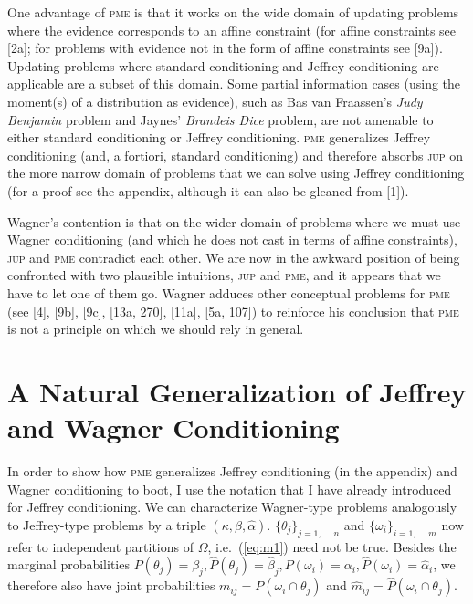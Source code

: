 \documentclass[entropy,article,submit,oneauthor,pdftex,12pt,a4paper]{mdpi}
\begin{document}
One advantage of \textsc{pme} is that it works on the wide domain of
updating problems where the evidence corresponds to an affine
constraint (for affine constraints see [2a]; for problems with
evidence not in the form of affine constraints see [9a]). Updating
problems where standard conditioning and Jeffrey conditioning are
applicable are a subset of this domain. Some partial information cases
(using the moment(s) of a distribution as evidence), such as Bas van
Fraassen's \emph{Judy Benjamin} problem and Jaynes' \emph{Brandeis
  Dice} problem, are not amenable to either standard conditioning or
Jeffrey conditioning. \textsc{pme} generalizes Jeffrey conditioning
(and, a fortiori, standard conditioning) and therefore absorbs
\textsc{jup} on the more narrow domain of problems that we can solve
using Jeffrey conditioning (for a proof see the appendix, although it
can also be gleaned from [1]). 

Wagner's contention is that on the wider domain of problems where we
must use Wagner conditioning (and which he does not cast in terms of
affine constraints), \textsc{jup} and \textsc{pme} contradict each
other. We are now in the awkward position of being confronted with two
plausible intuitions, \textsc{jup} and \textsc{pme}, and it appears
that we have to let one of them go. Wagner adduces other conceptual
problems for \textsc{pme} (see [4], [9b], [9c], [13a, 270], [11a],
[5a, 107]) to reinforce his conclusion that \textsc{pme} is not a
principle on which we should rely in general.

\section{A Natural Generalization of Jeffrey and Wagner Conditioning}
\label{Generalization}

In order to show how \textsc{pme} generalizes Jeffrey conditioning (in
the appendix) and Wagner conditioning to boot, I use the notation that
I have already introduced for Jeffrey conditioning. We can
characterize Wagner-type problems analogously to Jeffrey-type problems
by a triple $(\kappa,\beta,\hat{\alpha})$.
$\{\theta_{j}\}_{j=1,\ldots,n}$ and $\{\omega_{i}\}_{i=1,\ldots,m}$
now refer to independent partitions of $\Omega$, i.e.\ (\ref{eq:m1})
need not be true. Besides the marginal probabilities
$P(\theta_{j})=\beta_{j}, \hat{P}(\theta_{j})=\hat{\beta}_{j},
P(\omega_{i})=\alpha_{i},\hat{P}(\omega_{i})=\hat{\alpha}_{i}$, we
therefore also have joint probabilities
$m_{ij}=P(\omega_{i}\cap\theta_{j})$ and
$\hat{m}_{ij}=\hat{P}(\omega_{i}\cap\theta_{j})$.
\end{document}
